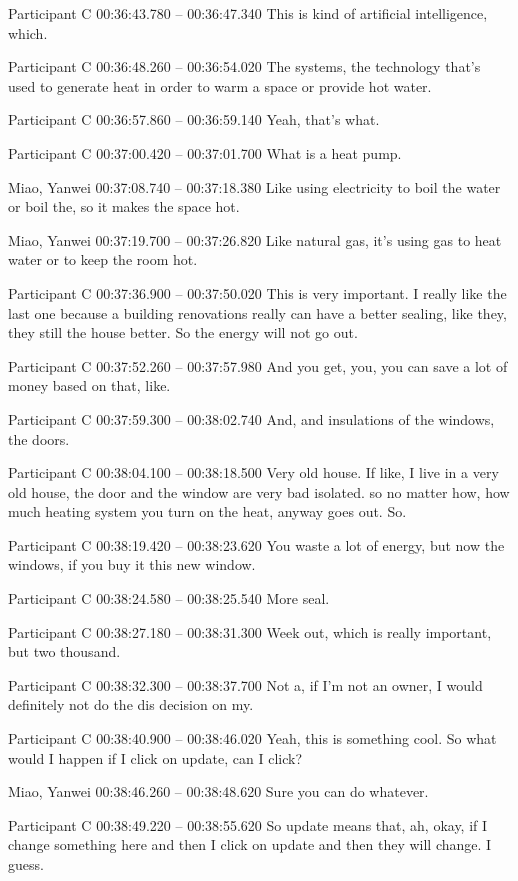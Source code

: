 {Participant C 00:36:43.780 -- 00:36:47.340
This is kind of artificial intelligence, which.

Participant C 00:36:48.260 -- 00:36:54.020
The systems, the technology that's used to generate heat in order to warm a space or provide hot water.

Participant C 00:36:57.860 -- 00:36:59.140
Yeah, that's what.

Participant C 00:37:00.420 -- 00:37:01.700
What is a heat pump.

Miao, Yanwei 00:37:08.740 -- 00:37:18.380
Like using electricity to boil the water or boil the, so it makes the space hot.

Miao, Yanwei 00:37:19.700 -- 00:37:26.820
Like natural gas, it's using gas to heat water or to keep the room hot.

Participant C 00:37:36.900 -- 00:37:50.020
This is very important. I really like the last one because a building renovations really can have a better sealing, like they, they still the house better. So the energy will not go out.

Participant C 00:37:52.260 -- 00:37:57.980
And you get, you, you can save a lot of money based on that, like.

Participant C 00:37:59.300 -- 00:38:02.740
And, and insulations of the windows, the doors.

Participant C 00:38:04.100 -- 00:38:18.500
Very old house. If like, I live in a very old house, the door and the window are very bad isolated. so no matter how, how much heating system you turn on the heat, anyway goes out. So.

Participant C 00:38:19.420 -- 00:38:23.620
You waste a lot of energy, but now the windows, if you buy it this new window.

Participant C 00:38:24.580 -- 00:38:25.540
More seal.

Participant C 00:38:27.180 -- 00:38:31.300
Week out, which is really important, but two thousand.

Participant C 00:38:32.300 -- 00:38:37.700
Not a, if I'm not an owner, I would definitely not do the dis decision on my.

Participant C 00:38:40.900 -- 00:38:46.020
Yeah, this is something cool. So what would I happen if I click on update, can I click?

Miao, Yanwei 00:38:46.260 -- 00:38:48.620
Sure you can do whatever.

Participant C 00:38:49.220 -- 00:38:55.620
So update means that, ah, okay, if I change something here and then I click on update and then they will change. I guess.

}
